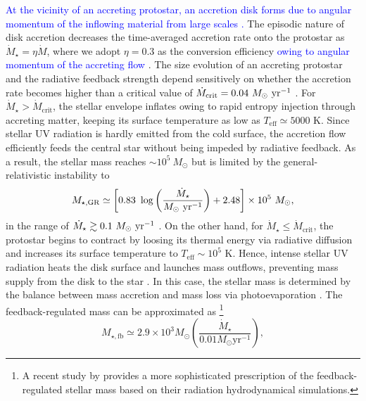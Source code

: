 \documentclass[twocolumn, twocolappendix]{aastex63}
\newcommand{\Msun}{M_\odot}
\newcommand{\Msunyr}{M_\odot~{\rm yr}^{-1}}
\newcommand{\Mdot}{\dot{M}}
\newcommand{\blue}[1]{\textcolor{blue}{ #1}}
\begin{document}
\begin{CJK*}{UTF8}{gbsn}
\blue{
At the vicinity of an accreting protostar, an accretion disk forms due to angular momentum of the inflowing material from large scales
\citep{2010MNRAS.403...45S,2011Sci...331.1040C,2011ApJ...737...75G}.}
The episodic nature of disk accretion decreases the time-averaged accretion rate onto the protostar as $\Mdot_{\star}=\eta \Mdot$, 
where we adopt $\eta=0.3$ as the conversion efficiency \blue{owing to angular momentum of the accreting flow} \citep{2016MNRAS.459.1137S, 2023MNRAS.518.1601T}. 
The size evolution of an accreting protostar and the radiative feedback strength depend sensitively on whether
the accretion rate becomes higher than a critical value of $\dot{M}_{\mathrm{crit}}=0.04~\Msunyr$ 
\citep{2001ApJ...561L..55O,2013ApJ...778..178H,2013A&A...558A..59S,2015MNRAS.452..755S,2018MNRAS.474.2757H}.
For $\dot{M}_\star > \Mdot_\mathrm{crit}$, the stellar envelope inflates owing to rapid entropy injection through accreting matter,
keeping its surface temperature as low as $T_\mathrm{eff} \simeq 5000$ K. 
Since stellar UV radiation is hardly emitted from the cold surface, the accretion flow efficiently feeds the central star without being 
impeded by radiative feedback.
As a result, the stellar mass reaches $\sim 10^5~\Msun$ but is limited by the general-relativistic instability to
%
\begin{equation}
 M_{\star, \mathrm{GR}} \simeq\left[0.83~\log \left(\frac{\dot{M}_{\star}}{\Msunyr}\right)+2.48\right] \times 10^{5} ~\Msun,
\end{equation}
%
in the range of $\dot{M}_\star\gtrsim 0.1~\Msunyr$ \citep{2016PhRvD..94b1501S,2017ApJ...842L...6W,2019PASA...36...27W}.
On the other hand, for $\dot{M}_\star \leq \Mdot_\mathrm{crit}$, the protostar begins to contract by loosing its thermal energy via radiative diffusion
and increases its surface temperature to $T_\mathrm{eff} \sim 10^5$ K.
Hence, intense stellar UV radiation heats the disk surface and launches mass outflows, preventing mass supply from the disk to the star
\citep{2008ApJ...681..771M,2011Sci...334.1250H}. 
In this case, the stellar mass is determined by the balance between mass accretion and mass loss via photoevaporation \citep{2013ApJ...773..155T}.
The feedback-regulated mass can be approximated as
\footnote[2]{A recent study by \citet{2023MNRAS.518.1601T} provides a more sophisticated prescription of the feedback-regulated stellar mass based on their radiation hydrodynamical simulations.}
%
\begin{equation}
M_{\star, \mathrm{fb}} \simeq 2.9 \times 10^{3} \Msun\left(\frac{\dot{M}_{\star}}{0.01 M_{\odot} \mathrm{yr}^{-1}}\right),

\end{equation}
\end{CJK*}
\end{document}
